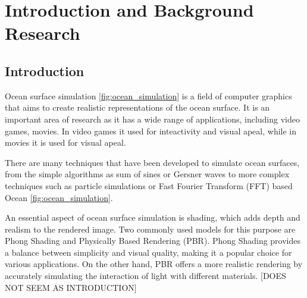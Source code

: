 \justifying
\chapter{Introduction and Background Research}



\label{chapter1}


\section{Introduction}
Ocean surface simulation \ref{fig:ocean_simulation} is a field of computer graphics that aims to create realistic representations of the ocean surface.
It is an important area of research as it has a wide range of applications, including video games, movies.
In video games it used for inteactivity and visual apeal, while in movies it is used for visual apeal. 

There are many techniques that have been developed to simulate ocean surfaces, from the simple algorithms as 
sum of sines or Gersner waves to more complex techniques such as particle simulations or Fast Fourier Transform (FFT) based Ocean \ref{fig:ocean_simulation}.

An essential aspect of ocean surface simulation is shading, which adds depth and realism to the rendered image. Two commonly used models for this purpose are Phong Shading and Physically Based Rendering (PBR). Phong Shading provides a balance between simplicity and visual quality, making it a popular choice for various applications. On the other hand, PBR offers a more realistic rendering by accurately simulating the interaction of light with different materials. [DOES NOT SEEM AS INTRODUCTION]

